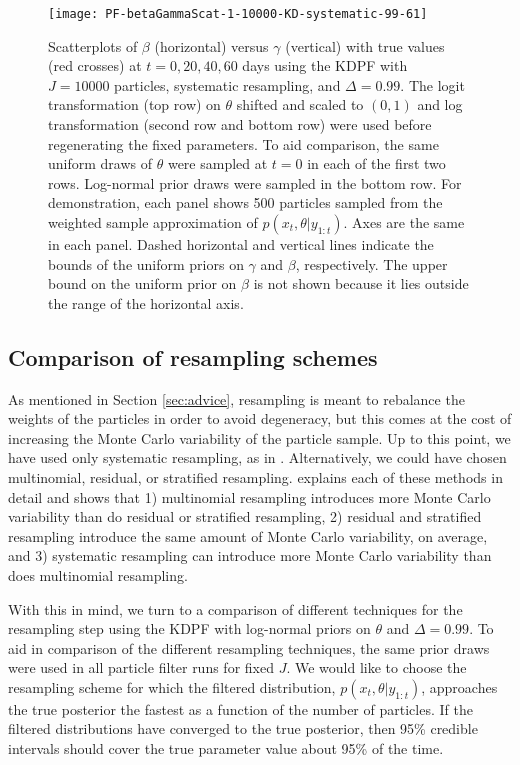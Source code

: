 \documentclass{elsarticle}
\begin{document}
\begin{figure}
\centering
\begin{minipage}{1.0\linewidth}
\texttt{[image: PF-betaGammaScat-1-10000-KD-systematic-99-61]}
\caption{Scatterplots of $\beta$ (horizontal) versus $\gamma$ (vertical) with true values (red crosses) at $t = 0, 20, 40, 60$ days using the KDPF with $J = 10000$ particles, systematic resampling, and $\Delta = 0.99$. The logit transformation (top row) on $\theta$ shifted and scaled to $(0,1)$ and log transformation (second row and bottom row) were used before regenerating the fixed parameters. To aid comparison, the same uniform draws of $\theta$ were sampled at $t = 0$ in each of the first two rows. Log-normal prior draws were sampled in the bottom row. For demonstration, each panel shows 500 particles sampled from the weighted sample approximation of $p(x_t,\theta|y_{1:t})$. Axes are the same in each panel. Dashed horizontal and vertical lines indicate the bounds of the uniform priors on $\gamma$ and $\beta$, respectively. The upper bound on the uniform prior on $\beta$ is not shown because it lies outside the range of the horizontal axis.} \label{fig:priors}
\end{minipage}
\end{figure}

\subsection{Comparison of resampling schemes \label{sec:resample}}

As mentioned in Section \ref{sec:advice}, resampling is meant to rebalance the weights of the particles in order to avoid degeneracy, but this comes at the cost of increasing the Monte Carlo variability of the particle sample. Up to this point, we have used only systematic resampling, as in \citet{skvortsov2012monitoring}. Alternatively, we could have chosen multinomial, residual, or stratified resampling. \citet{Douc:Capp:Moul:comp:2005} explains each of these methods in detail and shows that 1) multinomial resampling introduces more Monte Carlo variability than do residual or stratified resampling, 2) residual and stratified resampling introduce the same amount of Monte Carlo variability, on average, and 3) systematic resampling can introduce more Monte Carlo variability than does multinomial resampling.

With this in mind, we turn to a comparison of different techniques for the resampling step using the KDPF with log-normal priors on $\theta$ and $\Delta = 0.99$. To aid in comparison of the different resampling techniques, the same prior draws were used in all particle filter runs for fixed $J$. We would like to choose the resampling scheme for which the filtered distribution, $p(x_t,\theta|y_{1:t})$, approaches the true posterior the fastest as a function of the number of particles. If the filtered distributions have converged to the true posterior, then 95\% credible intervals should cover the true parameter value about 95\% of the time.
\end{document}
